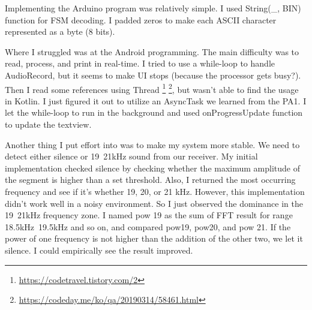 \documentclass[11pt,a4paper]{article}
\begin{document}
	Implementing the Arduino program was relatively simple. I used String(\_, BIN) function for FSM decoding. I padded zeros to make each ASCII character represented as a byte (8 bits). 
	
	Where I struggled was at the Android programming. The main difficulty was to read, process, and print in real-time. I tried to use a while-loop to handle AudioRecord, but it seems to make UI stops (because the processor gets busy?). Then I read some references using Thread \footnote{\url{https://codetravel.tistory.com/2}} \footnote{\url{https://codeday.me/ko/qa/20190314/58461.html}}, but wasn't able to find the usage in Kotlin. I just figured it out to utilize an AsyncTask we learned from the PA1. I let the while-loop to run in the background and used onProgressUpdate function to update the textview.
	
	Another thing I put effort into was to make my system more stable. We need to detect either silence or 19~21kHz sound from our receiver. My initial implementation checked silence by checking whether the maximum amplitude of the segment is higher than a set threshold. Also, I returned the most occurring frequency and see if it's whether 19, 20, or 21 kHz. However, this implementation didn't work well in a noisy environment. So I just observed the dominance in the 19~21kHz frequency zone. I named pow 19 as the sum of FFT result for range 18.5kHz~19.5kHz and so on, and compared pow19, pow20, and pow 21. If the power of one frequency is not higher than the addition of the other two, we let it silence. I could empirically see the result improved.
\end{document}
